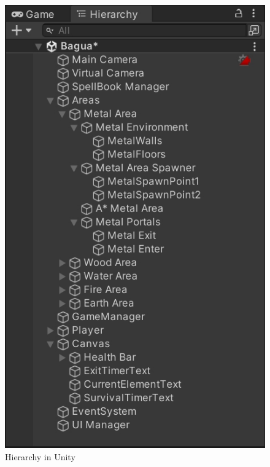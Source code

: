 \documentclass[10pt,twocolumn]{article}
\begin{document}
\begin{figure}[h]
    \centering
    \includegraphics[width=\columnwidth]{figure3.png} %
    \caption{Hierarchy in Unity}
    \label{fig:figure3} %
\end{figure}
\end{document}
